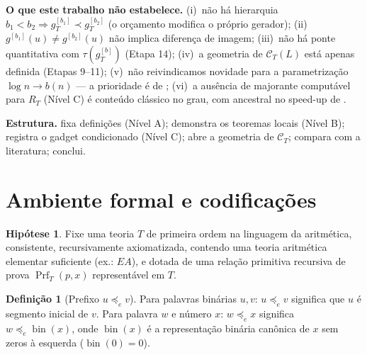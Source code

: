 \documentclass[11pt,a4paper]{article}
\theoremstyle{definition}
\newtheorem{definition}[theorem]{Definição}
\newtheorem{hypothesis}[theorem]{Hipótese}
\theoremstyle{remark}
\newcommand{\Prf}{\operatorname{Prf}}
\begin{document}
\medskip
\noindent\textbf{O que este trabalho não estabelece.}
(i)~não há hierarquia $b_1 < b_2 \Rightarrow g_T^{[b_1]} \prec g_T^{[b_2]}$ (o
orçamento modifica o próprio gerador); (ii)~$g^{[b_1]}(u) \neq g^{[b_2]}(u)$ não
implica diferença de imagem; (iii)~não há ponte quantitativa com
$\tau(g_T^{[b]})$ (Etapa 14); (iv)~a geometria de $\mathcal{C}_T(L)$ está apenas
definida (Etapas 9--11); (v)~não reivindicamos novidade para a parametrização
$\log n \to b(n)$ — a prioridade é de \cite{Krajicek2025}; (vi)~a ausência de
majorante computável para $R_T$ (Nível C) é conteúdo clássico no grau, com
ancestral no speed-up de \cite{Godel1936}.

\medskip
\noindent\textbf{Estrutura.}  fixa definições (Nível A);
 demonstra os teoremas locais (Nível B);
 registra o gadget condicionado (Nível C);
 abre a geometria de $\mathcal{C}_T$;
 compara com a literatura;
 conclui.

\section{Ambiente formal e codifica\c{c}\~{o}es}\label{sec:ambiente}

\begin{hypothesis}\label{hyp:T}
Fixe uma teoria $T$ de primeira ordem na linguagem da aritm\'{e}tica, consistente,
recursivamente axiomatizada, contendo uma teoria aritm\'{e}tica elementar suficiente
(ex.: $EA$), e dotada de uma rela\c{c}\~{a}o primitiva recursiva de prova
$\Prf_T(p,x)$ represent\'{a}vel em $T$.
\end{hypothesis}


\begin{definition}[Prefixo $u \preceq_{e} v$]\label{def:prefixo}
Para palavras binárias $u, v$: $u \preceq_{e} v$ significa que $u$ é segmento
inicial de $v$. Para palavra $w$ e número $x$: $w \preceq_{e} x$ significa
$w \preceq_{e} \operatorname{bin}(x)$, onde $\operatorname{bin}(x)$ é a
representação binária canônica de $x$ sem zeros à esquerda
($\operatorname{bin}(0) = 0$).
\end{definition}
\end{document}
